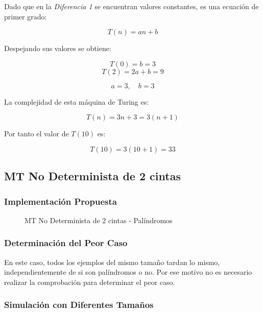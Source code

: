 \documentclass{uc3mpracticas}
\begin{document}
  Dado que en la \textit{Diferencia 1} se encuentran valores constantes, es una ecuación de primer grado:


  $$ T(n) = an+ b $$

  Despejando sus valores se obtiene:

  $$ T(0) = b = 3 $$
  $$ T(2) = 2a + b = 9 $$

  $$ a = 3 , \quad b = 3$$

  La complejidad de esta máquina de Turing es:

  $$ T(n) = 3n + 3 = 3(n+1) $$

  Por tanto el valor de $T(10)$ es:

  $$ T(10) = 3(10 + 1) = 33 $$


  \subsection{MT No Determinista de 2 cintas}

  \subsubsection{Implementación Propuesta}

  \begin{figure}[!h]
    \caption{MT No Determinista de 2 cintas - Palíndromos}
  \end{figure}


  \subsubsection{Determinación del Peor Caso}

  En este caso, todos los ejemplos del mismo tamaño tardan lo mismo, independientemente de si son palíndromos o no. Por ese motivo no es necesario realizar la comprobación para determinar el peor caso.

  \subsubsection{Simulación con Diferentes Tamaños}
\end{document}
